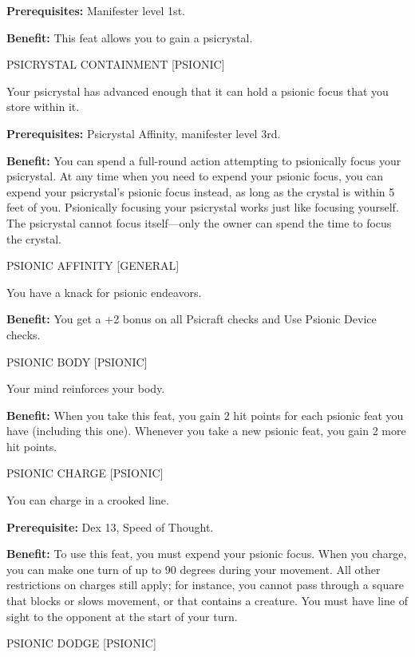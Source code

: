 \documentclass{article}
\begin{document}
\textbf{Prerequisites:} Manifester level 1st.

\textbf{Benefit:} This feat allows you to gain a psicrystal.

\vspace{12pt}
PSICRYSTAL CONTAINMENT [PSIONIC]

Your psicrystal has advanced enough that it can hold a psionic focus that you store 
within it.

\textbf{Prerequisites:} Psicrystal Affinity, manifester level 3rd.

\textbf{Benefit:} You can spend a full-round action attempting to psionically focus 
your psicrystal. At any time when you need to expend your psionic focus, you can 
expend your psicrystal's psionic focus instead, as long as the crystal is within 
5 feet of you. Psionically focusing your psicrystal works just like focusing yourself. 
The psicrystal cannot focus itself---only the owner can spend the time to focus 
the crystal.

\vspace{12pt}
PSIONIC AFFINITY [GENERAL]

You have a knack for psionic endeavors.

\textbf{Benefit:} You get a +2 bonus on all Psicraft checks and Use Psionic Device 
checks.

\vspace{12pt}
PSIONIC BODY [PSIONIC]

Your mind reinforces your body.

\textbf{Benefit:} When you take this feat, you gain 2 hit points for each psionic 
feat you have (including this one). Whenever you take a new psionic feat, you gain 
2 more hit points. 

\vspace{12pt}
PSIONIC CHARGE [PSIONIC]

You can charge in a crooked line.

\textbf{Prerequisite:} Dex 13, Speed of Thought.

\textbf{Benefit:} To use this feat, you must expend your psionic focus. When you 
charge, you can make one turn of up to 90 degrees during your movement. All other 
restrictions on charges still apply; for instance, you cannot pass through a square 
that blocks or slows movement, or that contains a creature. You must have line 
of sight to the opponent at the start of your turn.

\vspace{12pt}
PSIONIC DODGE [PSIONIC]
\end{document}
